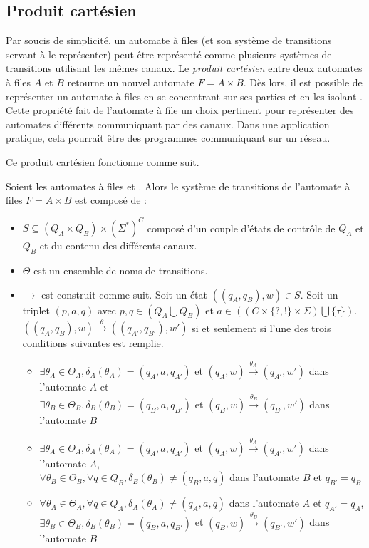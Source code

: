 \subsection{Produit cartésien}\label{ss:cartesien}

Par soucis de simplicité, un automate à files (et son système de transitions servant à le représenter) peut être représenté comme plusieurs systèmes de transitions utilisant les mêmes canaux. Le \emph{produit cartésien} entre deux automates à files $A$ et $B$ retourne un nouvel automate $F=A \times B$. Dès lors, il est possible de représenter un automate à files en se concentrant sur ses parties et en les isolant \cite{Suresh20}. Cette propriété fait de l'automate à file un choix pertinent pour représenter des automates différents communiquant par des canaux. Dans une application pratique, cela pourrait être des programmes communiquant sur un réseau.

Ce produit cartésien fonctionne comme suit.

Soient les automates à files \fifoA et \fifoB. Alors le système de transitions \tsys de l'automate à files $F=A\times B$ est composé de :
\begin{itemize}
  \item $S \subseteq (Q_A\times Q_B)\times (\Sigma^*)^C$ composé d'un couple d'états de contrôle de $Q_A$ et $Q_B$ et du contenu des différents canaux.
  \item $\Theta$ est un ensemble de noms de transitions.
  \item $\rightarrow$ est construit comme suit. Soit un état $((q_A,q_B), w)\in S$. Soit un triplet $(p,a,q)$ avec $p,q \in (Q_A \bigcup Q_B)$ et $a \in ((C \times \{?,!\} \times \Sigma) \bigcup \{\tau\})$.
  $((q_A,q_B),w)\xrightarrow{\theta}((q_{A'},q_{B'}),w')$ si et seulement si l'une des trois conditions suivantes est remplie.
  \begin{itemize}
    \item $\exists \theta_A\in\Theta_A, \delta_A(\theta_A)=(q_A,a,q_{A'})$ et  $(q_A,w)\xrightarrow{\theta_A}(q_{A'},w')$ dans l'automate $A$ et\\ $\exists \theta_B\in\Theta_B, \delta_B(\theta_B)=(q_B,a,q_{B'})$ et $(q_B,w)\xrightarrow{\theta_B}(q_{B'},w')$ dans l'automate $B$
    \item $\exists \theta_A\in\Theta_A, \delta_A(\theta_A)=(q_A,a,q_{A'})$ et  $(q_A,w)\xrightarrow{\theta_A}(q_{A'},w')$ dans l'automate $A$,\\
    $\forall \theta_B\in\Theta_B,\forall q \in Q_B,\delta_B(\theta_B)\neq(q_B,a,q)$ dans l'automate $B$ et $q_{B'}=q_B$
    \item $\forall \theta_A\in\Theta_A,\forall q \in Q_A,\delta_A(\theta_A)\neq(q_A,a,q)$ dans l'automate $A$ et $q_{A'}=q_A$,\\
    $\exists \theta_B\in\Theta_B, \delta_B(\theta_B)=(q_B,a,q_{B'})$ et  $(q_B,w)\xrightarrow{\theta_B}(q_{B'},w')$ dans l'automate $B$
  \end{itemize}
\end{itemize}

